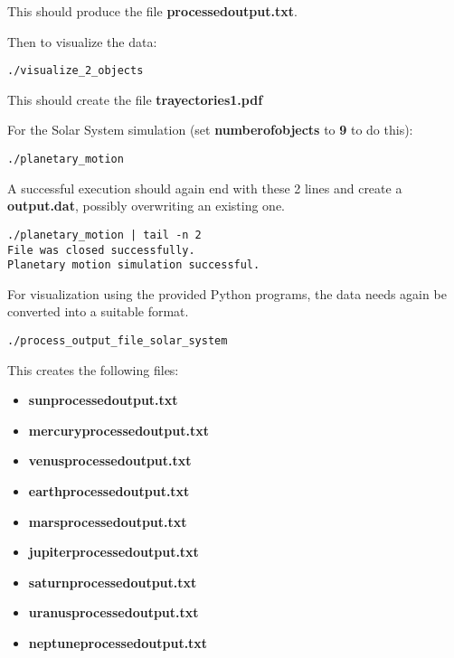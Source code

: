 \documentclass[12pt]{scrartcl}
\begin{document}
This should produce the file \textbf{processed\textunderscore{}output.txt}.

Then to visualize the data:
\begin{verbatim}
./visualize_2_objects
\end{verbatim}

This should create the file \textbf{trayectories1.pdf}

For the Solar System simulation (set \textbf{number\textunderscore{}of\textunderscore{}objects} to \textbf{9} to do this):

\begin{verbatim}
./planetary_motion
\end{verbatim}

A successful execution should again end with these 2 lines and create a \textbf{output.dat}, possibly overwriting an existing one.
\begin{verbatim}
./planetary_motion | tail -n 2
File was closed successfully.
Planetary motion simulation successful.
\end{verbatim}

For visualization using the provided Python programs, the data needs again be converted into a suitable format.

\begin{verbatim}
./process_output_file_solar_system
\end{verbatim}

This creates the following files:
\begin{itemize}
    \item \textbf{sun\textunderscore{}processed\textunderscore{}output.txt}
    \item \textbf{mercury\textunderscore{}processed\textunderscore{}output.txt}
    \item \textbf{venus\textunderscore{}processed\textunderscore{}output.txt}
    \item \textbf{earth\textunderscore{}processed\textunderscore{}output.txt}
    \item \textbf{mars\textunderscore{}processed\textunderscore{}output.txt}
    \item \textbf{jupiter\textunderscore{}processed\textunderscore{}output.txt}
    \item \textbf{saturn\textunderscore{}processed\textunderscore{}output.txt}
    \item \textbf{uranus\textunderscore{}processed\textunderscore{}output.txt}
    \item \textbf{neptune\textunderscore{}processed\textunderscore{}output.txt}
\end{itemize}
\end{document}
